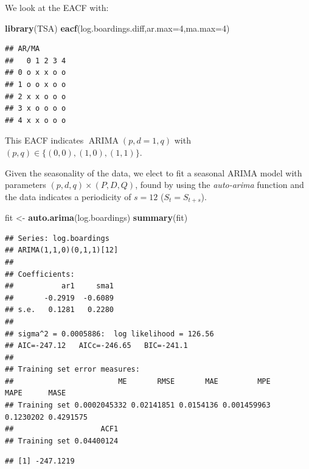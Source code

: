 \documentclass[
]{article}
\newenvironment{Shaded}{\begin{snugshade}}{\end{snugshade}}
\newcommand{\AttributeTok}[1]{\textcolor[rgb]{0.13,0.29,0.53}{#1}}
\newcommand{\DecValTok}[1]{\textcolor[rgb]{0.00,0.00,0.81}{#1}}
\newcommand{\FunctionTok}[1]{\textcolor[rgb]{0.13,0.29,0.53}{\textbf{#1}}}
\newcommand{\NormalTok}[1]{#1}
\newcommand{\OtherTok}[1]{\textcolor[rgb]{0.56,0.35,0.01}{#1}}
\newcommand{\SpecialCharTok}[1]{\textcolor[rgb]{0.81,0.36,0.00}{\textbf{#1}}}
\begin{document}
We look at the EACF with:

\begin{Shaded}
\begin{Highlighting}[]
\FunctionTok{library}\NormalTok{(TSA)}
\FunctionTok{eacf}\NormalTok{(log.boardings.diff,}\AttributeTok{ar.max=}\DecValTok{4}\NormalTok{,}\AttributeTok{ma.max=}\DecValTok{4}\NormalTok{)}
\end{Highlighting}
\end{Shaded}

\begin{verbatim}
## AR/MA
##   0 1 2 3 4
## 0 o x x o o
## 1 o o x o o
## 2 x x o o o
## 3 x o o o o
## 4 x x o o o
\end{verbatim}

This EACF indicates \(\operatorname{ARIMA}(p,d=1,q)\) with
\((p,q) \in \{(0,0),(1,0),(1,1)\}\).

Given the seasonality of the data, we elect to fit a seasonal ARIMA
model with parameters \((p,d,q) \times (P,D,Q)\), found by using the
\emph{auto-arima} function and the data indicates a periodicity of
\(s=12\) (\(S_t = S_{t+s}\)).

\begin{Shaded}
\begin{Highlighting}[]
\NormalTok{fit }\OtherTok{\textless{}{-}} \FunctionTok{auto.arima}\NormalTok{(log.boardings)}
\FunctionTok{summary}\NormalTok{(fit)}
\end{Highlighting}
\end{Shaded}

\begin{verbatim}
## Series: log.boardings 
## ARIMA(1,1,0)(0,1,1)[12] 
## 
## Coefficients:
##           ar1     sma1
##       -0.2919  -0.6089
## s.e.   0.1281   0.2280
## 
## sigma^2 = 0.0005886:  log likelihood = 126.56
## AIC=-247.12   AICc=-246.65   BIC=-241.1
## 
## Training set error measures:
##                        ME       RMSE       MAE         MPE      MAPE      MASE
## Training set 0.0002045332 0.02141851 0.0154136 0.001459963 0.1230202 0.4291575
##                    ACF1
## Training set 0.04400124
\end{verbatim}

\begin{Shaded}
\end{Shaded}

\begin{verbatim}
## [1] -247.1219
\end{verbatim}
\end{document}
